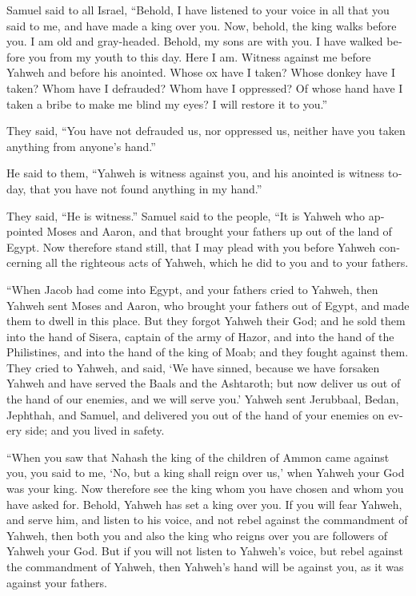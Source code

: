 \begin{paracol}{2}
\begin{otherlanguage}{english}
 Samuel said to all Israel, ``Behold, I have listened to
your voice in all that you said to me, and have made a king over you.
 Now, behold, the king walks before you. I am old and
gray-headed. Behold, my sons are with you. I have walked before you from
my youth to this day.  Here I am. Witness against me
before Yahweh and before his anointed. Whose ox have I taken? Whose
donkey have I taken? Whom have I defrauded? Whom have I oppressed? Of
whose hand have I taken a bribe to make me blind my eyes? I will restore
it to you.''

 They said, ``You have not defrauded us, nor oppressed us,
neither have you taken anything from anyone's hand.''

 He said to them, ``Yahweh is witness against you, and his
anointed is witness today, that you have not found anything in my
hand.''

They said, ``He is witness.''  Samuel said to the people,
``It is Yahweh who appointed Moses and Aaron, and that brought your
fathers up out of the land of Egypt.  Now therefore stand
still, that I may plead with you before Yahweh concerning all the
righteous acts of Yahweh, which he did to you and to your fathers.

 ``When Jacob had come into Egypt, and your fathers cried
to Yahweh, then Yahweh sent Moses and Aaron, who brought your fathers
out of Egypt, and made them to dwell in this place.  But
they forgot Yahweh their God; and he sold them into the hand of Sisera,
captain of the army of Hazor, and into the hand of the Philistines, and
into the hand of the king of Moab; and they fought against them.
 They cried to Yahweh, and said, `We have sinned, because
we have forsaken Yahweh and have served the Baals and the Ashtaroth; but
now deliver us out of the hand of our enemies, and we will serve you.'
 Yahweh sent Jerubbaal, Bedan, Jephthah, and Samuel, and
delivered you out of the hand of your enemies on every side; and you
lived in safety.

 ``When you saw that Nahash the king of the children of
Ammon came against you, you said to me, `No, but a king shall reign over
us,' when Yahweh your God was your king.  Now therefore
see the king whom you have chosen and whom you have asked for. Behold,
Yahweh has set a king over you.  If you will fear Yahweh,
and serve him, and listen to his voice, and not rebel against the
commandment of Yahweh, then both you and also the king who reigns over
you are followers of Yahweh your God.  But if you will
not listen to Yahweh's voice, but rebel against the commandment of
Yahweh, then Yahweh's hand will be against you, as it was against your
fathers.


\end{otherlanguage}
\end{paracol}
